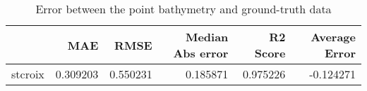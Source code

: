 \begin{table}[h!]
\caption{Error between the point bathymetry and ground-truth data}
\label{tab:stcroix_lidar_error}
\begin{tabular}{lrrrrr}
\toprule
 & MAE & RMSE & Median Abs error & R2 Score & Average Error \\
\midrule
stcroix & 0.309203 & 0.550231 & 0.185871 & 0.975226 & -0.124271 \\
\bottomrule
\end{tabular}
\end{table}
